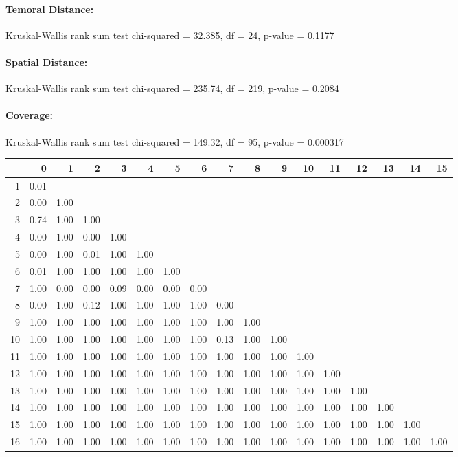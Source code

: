 \documentclass[a4paper,headsepline,footsepline,fontsize=11pt,BCOR=12mm,DIV=12]{report}
\begin{document}
\paragraph{Temoral Distance:}
Kruskal-Wallis rank sum test chi-squared = 32.385, df = 24, p-value = 0.1177

\paragraph{Spatial Distance:}
Kruskal-Wallis rank sum test chi-squared = 235.74, df = 219, p-value = 0.2084

\paragraph{Coverage:}
Kruskal-Wallis rank sum test chi-squared = 149.32, df = 95, p-value = 0.000317

\begin{tabular}{rrrrrrrrrrrrrrrrr}
  \hline
 & 0 & 1 & 2 & 3 & 4 & 5 & 6 & 7 & 8 & 9 & 10 & 11 & 12 & 13 & 14 & 15 \\ 
  \hline
1 & 0.01 &  &  &  &  &  &  &  &  &  &  &  &  &  &  &  \\ 
  2 & 0.00 & 1.00 &  &  &  &  &  &  &  &  &  &  &  &  &  &  \\ 
  3 & 0.74 & 1.00 & 1.00 &  &  &  &  &  &  &  &  &  &  &  &  &  \\ 
  4 & 0.00 & 1.00 & 0.00 & 1.00 &  &  &  &  &  &  &  &  &  &  &  &  \\ 
  5 & 0.00 & 1.00 & 0.01 & 1.00 & 1.00 &  &  &  &  &  &  &  &  &  &  &  \\ 
  6 & 0.01 & 1.00 & 1.00 & 1.00 & 1.00 & 1.00 &  &  &  &  &  &  &  &  &  &  \\ 
  7 & 1.00 & 0.00 & 0.00 & 0.09 & 0.00 & 0.00 & 0.00 &  &  &  &  &  &  &  &  &  \\ 
  8 & 0.00 & 1.00 & 0.12 & 1.00 & 1.00 & 1.00 & 1.00 & 0.00 &  &  &  &  &  &  &  &  \\ 
  9 & 1.00 & 1.00 & 1.00 & 1.00 & 1.00 & 1.00 & 1.00 & 1.00 & 1.00 &  &  &  &  &  &  &  \\ 
  10 & 1.00 & 1.00 & 1.00 & 1.00 & 1.00 & 1.00 & 1.00 & 0.13 & 1.00 & 1.00 &  &  &  &  &  &  \\ 
  11 & 1.00 & 1.00 & 1.00 & 1.00 & 1.00 & 1.00 & 1.00 & 1.00 & 1.00 & 1.00 & 1.00 &  &  &  &  &  \\ 
  12 & 1.00 & 1.00 & 1.00 & 1.00 & 1.00 & 1.00 & 1.00 & 1.00 & 1.00 & 1.00 & 1.00 & 1.00 &  &  &  &  \\ 
  13 & 1.00 & 1.00 & 1.00 & 1.00 & 1.00 & 1.00 & 1.00 & 1.00 & 1.00 & 1.00 & 1.00 & 1.00 & 1.00 &  &  &  \\ 
  14 & 1.00 & 1.00 & 1.00 & 1.00 & 1.00 & 1.00 & 1.00 & 1.00 & 1.00 & 1.00 & 1.00 & 1.00 & 1.00 & 1.00 &  &  \\ 
  15 & 1.00 & 1.00 & 1.00 & 1.00 & 1.00 & 1.00 & 1.00 & 1.00 & 1.00 & 1.00 & 1.00 & 1.00 & 1.00 & 1.00 & 1.00 &  \\ 
  16 & 1.00 & 1.00 & 1.00 & 1.00 & 1.00 & 1.00 & 1.00 & 1.00 & 1.00 & 1.00 & 1.00 & 1.00 & 1.00 & 1.00 & 1.00 & 1.00 \\ 
   \hline
\end{tabular}
\end{document}
